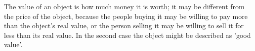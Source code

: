 The value of an object is how much money it is worth; it may be
different from the price of the object, because the people buying
it may be willing to pay more than the object's real value, or
the person selling it may be willing to sell it for less than
its real value. In the second case the object might be described
as 'good value'.